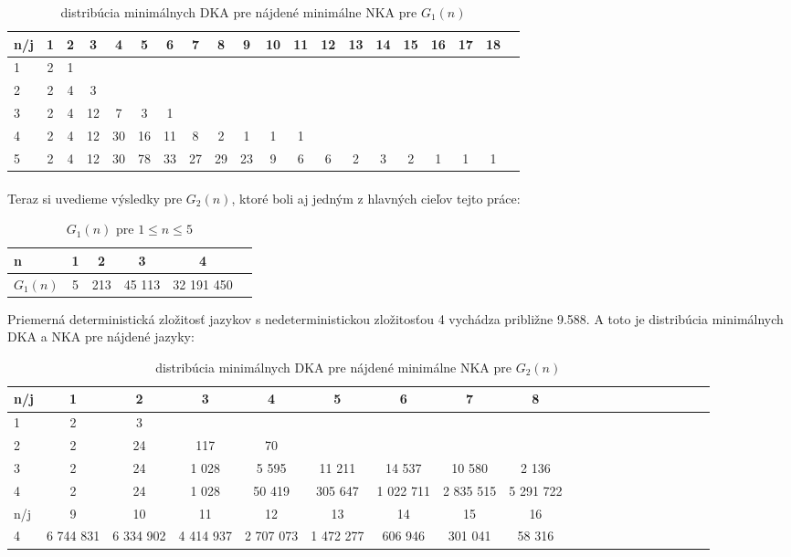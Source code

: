 \begin{table}[h]
  \centering
  \begin{tabular}{|l|c|c|c|c|c|c|c|c|c|c|c|c|c|c|c|c|c|c|r|}
    \hline
    n/j & 1 & 2 & 3 & 4 & 5 & 6 & 7 & 8 & 9 & 10 & 11 & 12 & 13 & 14 & 15 & 16 & 17 & 18 \\ 
    \hline
    1 & 2 & 1 & & & & & & & & & & & & & & & &\\ 
    \hline
    2 & 2 & 4 & 3 & & & & & & & & & & & & & & &\\
    \hline
    3 & 2 & 4 & 12 & 7 & 3 & 1 & & & & & & & & & & & &\\
    \hline
    4 & 2 & 4 & 12 & 30 & 16 & 11 & 8 & 2 & 1 & 1 & 1 & & & & & & &\\
    \hline
    5 & 2 & 4 & 12 & 30 & 78 & 33 & 27 & 29 & 23 & 9 & 6 & 6 & 2 & 3 & 2 & 1 & 1 & 1 \\
    \hline
  \end{tabular}
  \caption{distribúcia minimálnych DKA pre nájdené minimálne NKA pre $G_1(n)$}
  \label{tab:G1n}
\end{table}

\paragraph{}
Teraz si uvedieme výsledky pre $G_2(n)$, ktoré boli aj jedným z hlavných cieľov tejto práce:

\begin{table}[h]
  \centering
  \begin{tabular}{|l|c|c|c|c|r|}
    \hline
    n & 1 & 2 & 3 & 4 \\ 
    \hline
    $G_1(n)$ & 5 & 213 & 45 113 & 32 191 450 \\ 
    \hline
  \end{tabular}
  \caption{$G_1(n)$ pre $1 \leq n \leq 5$}
  \label{tab:G1n}
\end{table}

Priemerná deterministická zložitosť jazykov s nedeterministickou zložitosťou 4 vychádza približne 9.588. A toto je distribúcia minimálnych DKA a NKA pre nájdené jazyky:

\begin{table}[h]
  \centering
  \begin{tabular}{|l|c|c|c|c|c|c|c|c|c|c|c|c|c|c|c|c|c|c|r|}
    \hline
    n/j & 1 & 2 & 3 & 4 & 5 & 6 & 7 & 8 \\ 
    \hline
    1 & 2 & 3 & & & & & &\\ 
    \hline
    2 & 2 & 24 & 117 & 70 & & & &\\
    \hline
    3 & 2 & 24 & 1 028 & 5 595 & 11 211 & 14 537 & 10 580 & 2 136\\
    \hline
    4 & 2 & 24 & 1 028 & 50 419 & 305 647 & 1 022 711 & 2 835 515 & 5 291 722 \\
    \hline
    n/j & 9 & 10 & 11 & 12 & 13 & 14 & 15 & 16 \\
    \hline
    4 & 6 744 831 & 6 334 902 & 4 414 937 & 2 707 073 & 1 472 277 & 606 946 & 301 041 & 58 316\\
    \hline
  \end{tabular}
  \caption{distribúcia minimálnych DKA pre nájdené minimálne NKA pre $G_2(n)$}
  \label{tab:G1n}
\end{table}


